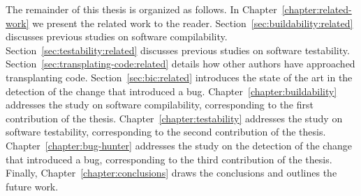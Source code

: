 The remainder of this thesis is organized as follows.
In Chapter~\ref{chapter:related-work} we present the related work to the reader. 
Section~\ref{sec:buildability:related} discusses previous studies on software compilability. 
Section~\ref{sec:testability:related} discusses previous studies on software testability. 
Section~\ref{sec:transplating-code:related} details how other authors have approached transplanting code. 
Section~\ref{sec:bic:related} introduces the state of the art in the detection of the change that introduced a bug.
Chapter~\ref{chapter:buildability} addresses the study on software compilability, corresponding to the first contribution of the thesis.
Chapter~\ref{chapter:testability} addresses the study on software testability, corresponding to the second contribution of the thesis.
Chapter~\ref{chapter:bug-hunter} addresses the study on the detection of the change that introduced a bug, corresponding to the third contribution of the thesis.
Finally, Chapter~\ref{chapter:conclusions} draws the conclusions and outlines the future work.

